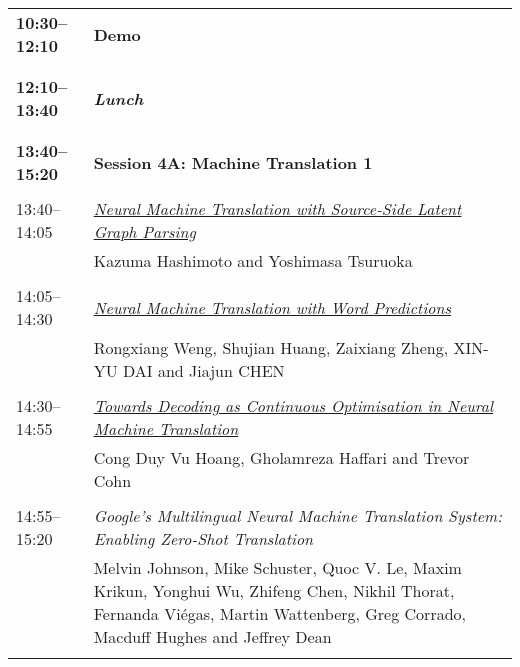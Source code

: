 \begin{tabular}{p{20mm}p{128mm}}
\\{\bf 10:30--12:10} & {\bf Demo } \\
\\
\\{\bf 12:10--13:40} & {\bf\em Lunch} \\
\\
\\{\bf 13:40--15:20} & {\bf Session 4A: Machine Translation 1 } \\
\\
13:40--14:05 & \hyperlink{page.125}{\em Neural Machine Translation with Source-Side Latent Graph Parsing}\\
         & Kazuma Hashimoto and Yoshimasa Tsuruoka \\
\\

14:05--14:30 & \hyperlink{page.136}{\em Neural Machine Translation with Word Predictions}\\
         & Rongxiang Weng, Shujian Huang, Zaixiang Zheng, XIN-YU DAI and Jiajun CHEN \\
\\

14:30--14:55 & \hyperlink{page.146}{\em Towards Decoding as Continuous Optimisation in Neural Machine Translation}\\
         & Cong Duy Vu Hoang, Gholamreza Haffari and Trevor Cohn \\
\\

14:55--15:20 & {\em Google's Multilingual Neural Machine Translation System: Enabling Zero-Shot Translation}\\
         & Melvin Johnson, Mike Schuster, Quoc V. Le, Maxim Krikun, Yonghui Wu, Zhifeng Chen, Nikhil Thorat, Fernanda Vi\'{e}gas, Martin Wattenberg, Greg Corrado, Macduff Hughes and Jeffrey Dean \\
\\

\end{tabular}
\newpage
